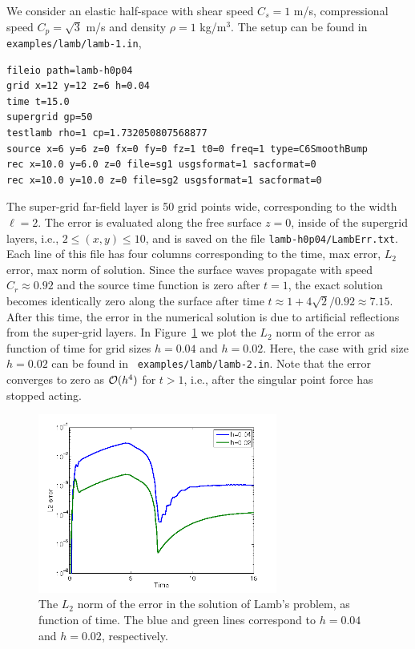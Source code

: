 \documentclass[11pt]{report}
\begin{document}
We consider an elastic half-space with shear speed $C_s=1$ m/s, compressional speed
$C_p=\sqrt{3}$ m/s and density $\rho=1$ kg/m$^3$. The setup can be found in {\tt
  examples/lamb/lamb-1.in},
\begin{verbatim}
fileio path=lamb-h0p04
grid x=12 y=12 z=6 h=0.04
time t=15.0
supergrid gp=50
testlamb rho=1 cp=1.732050807568877
source x=6 y=6 z=0 fx=0 fy=0 fz=1 t0=0 freq=1 type=C6SmoothBump
rec x=10.0 y=6.0 z=0 file=sg1 usgsformat=1 sacformat=0
rec x=10.0 y=10.0 z=0 file=sg2 usgsformat=1 sacformat=0
\end{verbatim}
The super-grid far-field layer is 50 grid points wide, corresponding to the width $\ell=2$.  The
error is evaluated along the free surface $z=0$, inside of the supergrid layers, i.e., $2\leq (x,y) \leq 10$, and is
saved on the file \verb+lamb-h0p04/LambErr.txt+. Each line of this file has four columns
corresponding to the time, max error, $L_2$ error, max norm of solution. Since the surface waves
propagate with speed $C_r\approx 0.92$ and the source time function is zero after $t=1$, the exact
solution becomes identically zero along the surface after time $t\approx 1 + 4\sqrt{2}/0.92 \approx
7.15$. After this time, the error in the numerical solution is due to artificial reflections from
the super-grid layers. In Figure~\ref{fig:lamb-err} we plot the $L_2$ norm of the error as function of time for
grid sizes $h=0.04$ and $h=0.02$. Here, the case with grid size $h=0.02$ can be found in {\tt
  examples/lamb/lamb-2.in}. Note that the error converges to zero as ${\cal O}(h^4)$ for $t>1$,
i.e., after the singular point force has stopped acting.
\begin{figure}[ht]
\begin{center}
\includegraphics[width=0.7\textwidth]{lamb-err.png}
\caption{The $L_2$ norm of the error in the solution of Lamb's problem, as function of time. The blue
and green lines correspond to $h=0.04$ and $h=0.02$, respectively.}
\label{fig:lamb-err}
\end{center}
\end{figure}
\end{document}
